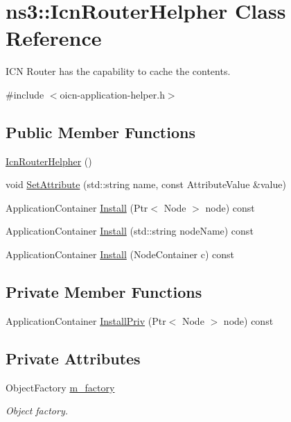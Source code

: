 \hypertarget{classns3_1_1IcnRouterHelpher}{\section{ns3\-:\-:Icn\-Router\-Helpher Class Reference}
\label{classns3_1_1IcnRouterHelpher}
}


I\-C\-N Router has the capability to cache the contents.  




{\ttfamily \#include $<$oicn-\/application-\/helper.\-h$>$}

\subsection*{Public Member Functions}
\begin{DoxyCompactItemize}
\item 
\hyperlink{classns3_1_1IcnRouterHelpher_a3cb1509ce406113dd7d7b9cfe07b76b1}{Icn\-Router\-Helpher} ()
\item 
void \hyperlink{classns3_1_1IcnRouterHelpher_aa2820444ac554e404d9fd6ce5f8a8fe6}{Set\-Attribute} (std\-::string name, const Attribute\-Value \&value)
\item 
Application\-Container \hyperlink{classns3_1_1IcnRouterHelpher_acef840c519effa743944c8e6eb1a422b}{Install} (Ptr$<$ Node $>$ node) const 
\item 
Application\-Container \hyperlink{classns3_1_1IcnRouterHelpher_acbe0017e55f293cd2c61aee1263e1878}{Install} (std\-::string node\-Name) const 
\item 
Application\-Container \hyperlink{classns3_1_1IcnRouterHelpher_a0846f519c253e08ceb8292aee2e46b67}{Install} (Node\-Container c) const 
\end{DoxyCompactItemize}
\subsection*{Private Member Functions}
\begin{DoxyCompactItemize}
\item 
Application\-Container \hyperlink{classns3_1_1IcnRouterHelpher_ade395ffa9be3d533ff54253fb2eb2b33}{Install\-Priv} (Ptr$<$ Node $>$ node) const 
\end{DoxyCompactItemize}
\subsection*{Private Attributes}
\begin{DoxyCompactItemize}
\item 
Object\-Factory \hyperlink{classns3_1_1IcnRouterHelpher_a1a9a541fc339cb6541195330b1c74009}{m\-\_\-factory}
\begin{DoxyCompactList}\small\item\em Object factory. \end{DoxyCompactList}\end{DoxyCompactItemize}



